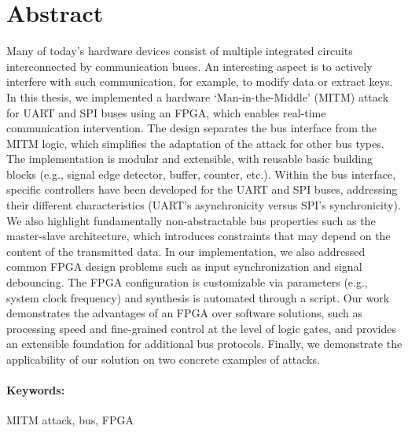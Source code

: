 \documentclass[12pt, twoside]{book}
\begin{document}
\section*{Abstract}

Many of today’s hardware devices consist of multiple integrated circuits interconnected by communication buses. An interesting aspect is to actively interfere with such communication, for example, to modify data or extract keys. In this thesis, we implemented a hardware `Man-in-the-Middle' (MITM) attack for UART and SPI buses using an FPGA, which enables real-time communication intervention. The design separates the bus interface from the MITM logic, which simplifies the adaptation of the attack for other bus types. The implementation is modular and extensible, with reusable basic building blocks (e.g., signal edge detector, buffer, counter, etc.). Within the bus interface, specific controllers have been developed for the UART and SPI buses, addressing their different characteristics (UART’s asynchronicity versus SPI’s synchronicity). We also highlight fundamentally non-abstractable bus properties such as the master-slave architecture, which introduces constraints that may depend on the content of the transmitted data. In our implementation, we also addressed common FPGA design problems such as input synchronization and signal debouncing. The FPGA configuration is customizable via parameters (e.g., system clock frequency) and synthesis is automated through a script. Our work demonstrates the advantages of an FPGA over software solutions, such as processing speed and fine-grained control at the level of logic gates, and provides an extensible foundation for additional bus protocols. Finally, we demonstrate the applicability of our solution on two concrete examples of attacks.

\paragraph*{Keywords:} MITM attack, bus, FPGA


%
%
%
\end{document}
